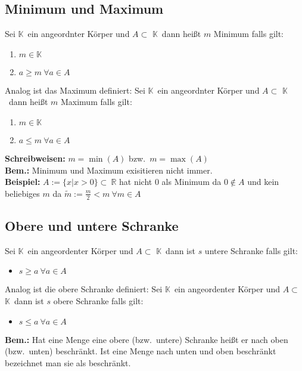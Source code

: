 \documentclass[12pt]{article}
\newcommand{\Korp}{$\mathbb{K}$}
\begin{document}
    \subsection{Minimum und Maximum}
    Sei \Korp\ ein angeordnter Körper und $A \subset$ \Korp\ dann heißt
    $m$ Minimum falls gilt:
    \begin{enumerate}
        \item $m \in \mathbb{K}$
        \item $a \geq m\ \forall a \in A$
    \end{enumerate}
    Analog ist das Maximum definiert:
    Sei \Korp\ ein angeordnter Körper und $A \subset$ \Korp\ dann heißt
    $m$ Maximum falls gilt:
    \begin{enumerate}
        \item $m \in \mathbb{K}$
        \item $a \leq m\ \forall a \in A$
    \end{enumerate}
    \textbf{Schreibweisen:}
    $m = \min{(A)}$ bzw.\ $m = \max{(A)}$\\
    \textbf{Bem.:}
    Minimum und Maximum exisitieren nicht immer.\\
    \textbf{Beispiel:} $A := \{x | x>0\}\subset\ \mathbb{R}$
    hat nicht 0 als Minimum da $0 \notin A$ und kein beliebiges $m$ da $\tilde{m} := \frac{m}{2} < m\ \forall m \in A$

    \subsection{Obere und untere Schranke}
    Sei \Korp\ ein angeordenter Körper und $A \subset$ \Korp\ dann ist $s$ untere
    Schranke falls gilt:
    \begin{itemize}
        \item $s \geq a\ \forall a \in A$
    \end{itemize}

     Analog ist die obere Schranke definiert:
    Sei \Korp\ ein angeordenter Körper und $A \subset$ \Korp\ dann ist $s$ obere
    Schranke falls gilt:
    \begin{itemize}
        \item $s \leq a\ \forall a \in A$
    \end{itemize}

    \textbf{Bem.:} Hat eine Menge eine obere (bzw.\ untere) Schranke
    heißt er nach oben (bzw.\ unten) beschränkt. Ist eine Menge nach unten und
    oben beschränkt bezeichnet man sie als beschränkt.
\end{document}
